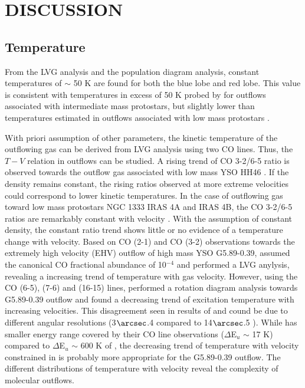 \section{DISCUSSION}\label{discussion}

\subsection{Temperature}
From the LVG analysis and the population diagram analysis, constant temperatures of $\sim$ 50 K are found for both the blue lobe and red lobe. This value is consistent with temperatures in excess of 50 K probed by \citet{2016A&A...587A..17V} for outflows associated with intermediate mass protostars, but slightly lower than temperatures estimated in outflows associated with low mass protostars \citep{2009A&A...501..633V, 2012A&A...542A..86Y}.

With priori assumption of other parameters, the kinetic temperature of the outflowing gas can be derived from LVG analysis using two CO lines. Thus, the $T-V$ relation in outflows can be studied. A rising trend of CO 3-2/6-5 ratio is observed towards the outflow gas associated with low mass YSO HH46 \citep{2009A&A...501..633V}. If the density remains constant, the rising ratios observed at more extreme velocities could correspond to lower kinetic temperatures. In the case of outflowing gas toward low mass protostars NGC 1333 IRAS 4A and  IRAS 4B, the CO 3-2/6-5 ratios are remarkably constant with velocity \citep{2012A&A...542A..86Y}. With the assumption of constant density, the constant ratio trend shows little or no evidence of a temperature change with velocity. Based on CO (2-1) and CO (3-2) observations towards the extremely high velocity (EHV) outflow of high mass YSO G5.89-0.39, \citet{2012ApJ...744L..26S} assumed the canonical CO fractional abundance of 10$^{-4}$ and performed a LVG anylysis, revealing a increasing trend of temperature with gas velocity. However, using the CO (6-5), (7-6) and (16-15) lines, \citet{2015A&A...584A..70L} performed a rotation diagram analysis towards G5.89-0.39 outflow and found a decreasing trend of excitation temperature with increasing velocities. This disagreement seen in results of \citet{2012ApJ...744L..26S} and \citet{2015A&A...584A..70L} cound be due to different angular resolutions (3${\arcsec}$.4 compared to 14${\arcsec}$.5 ). While \citet{2012ApJ...744L..26S} has smaller energy range covered by their CO line observations ($\Delta$E$_u$ $\sim$ 17 K) compared to $\Delta$E$_u$ $\sim$ 600 K of \citet{2015A&A...584A..70L}, the decreasing trend of temperature with velocity constrained in \citet{2015A&A...584A..70L} is probably more appropriate for the G5.89-0.39 outflow. The different distributions of temperature with velocity reveal the complexity of molecular outflows. 

